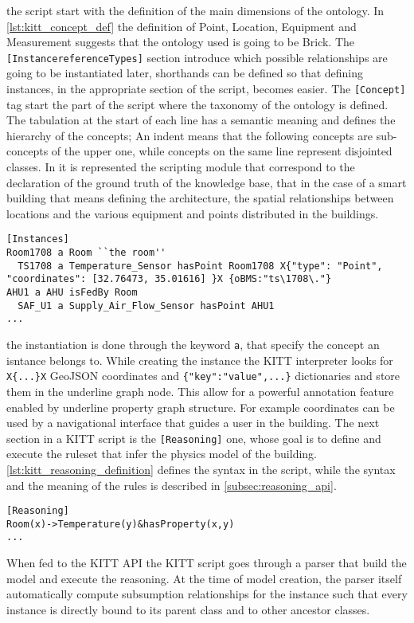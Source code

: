 the script start with the definition of the main dimensions of the ontology. In \autoref{lst:kitt_concept_def} the definition of Point, Location, Equipment and Measurement suggests that the ontology used is going to be Brick. The \verb|[InstancereferenceTypes]| section introduce which possible relationships are going to be instantiated later, shorthands can be defined so that defining instances, in the appropriate section of the script, becomes easier. The \verb|[Concept]| tag start the part of the script where the taxonomy of the ontology is defined. The tabulation at the start of each line has a semantic meaning and defines the hierarchy of the concepts; An indent means that the following concepts are sub-concepts of the upper one, while concepts on the same line represent disjointed classes. In it is represented the scripting module that correspond to the declaration of the ground truth of the knowledge base, that in the case of a smart building that means defining the architecture, the spatial relationships between locations and the various equipment and points distributed in the buildings.
\begin{lstlisting}[label={lst:kitt_instance_definition}, caption={Definition of instances}, breaklines=true]
[Instances]
Room1708 a Room ``the room''
  TS1708 a Temperature_Sensor hasPoint Room1708 X{"type": "Point", "coordinates": [32.76473, 35.01616] }X {oBMS:"ts\1708\."}
AHU1 a AHU isFedBy Room
  SAF_U1 a Supply_Air_Flow_Sensor hasPoint AHU1
...
\end{lstlisting}
the instantiation is done through the keyword \verb|a|, that specify the concept an isntance belongs to. While creating the instance the KITT interpreter looks for \verb|X{...}X| GeoJSON coordinates and \verb|{"key":"value",...}| dictionaries and store them in the underline graph node. This allow for a powerful annotation feature enabled by underline property graph structure. For example coordinates can be used by a navigational interface that guides a user in the building.
The next section in a KITT script is the \verb|[Reasoning]| one, whose goal is to define and execute the ruleset that infer the physics model of the building. \autoref{lst:kitt_reasoning_definition} defines the syntax in the script, while the syntax and the meaning of the rules is described in \autoref{subsec:reasoning_api}.
\begin{lstlisting}[label={lst:kitt_reasoning_definition}, caption={Definition of reasoning ruleset}, breaklines=true]
[Reasoning]
Room(x)->Temperature(y)&hasProperty(x,y)
...
\end{lstlisting}
When fed to the KITT API the KITT script goes through a parser that build the model and execute the reasoning. At the time of model creation, the parser itself automatically compute subsumption relationships for the instance such that every instance is directly bound to its parent class and to other ancestor classes.


